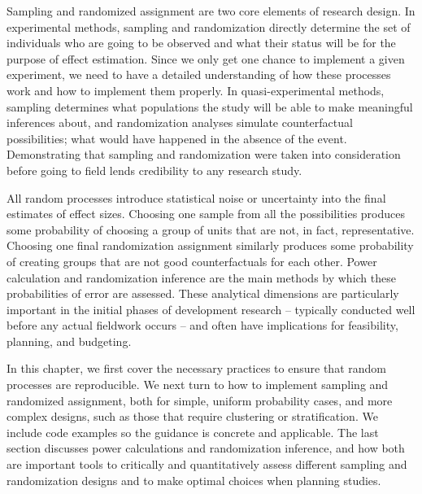 
\begin{fullwidth}
Sampling and randomized assignment are two core elements of research design.
In experimental methods, sampling and randomization directly determine
the set of individuals who are going to be observed
and what their status will be for the purpose of effect estimation.
Since we only get one chance to implement a given experiment,
we need to have a detailed understanding of how these processes work
and how to implement them properly.
In quasi-experimental methods, sampling determines what populations the study
will be able to make meaningful inferences about,
and randomization analyses simulate counterfactual possibilities;
what would have happened in the absence of the event.
Demonstrating that sampling and randomization were taken into consideration
before going to field lends credibility to any research study.

All random processes introduce statistical noise
or uncertainty into the final estimates of effect sizes.
Choosing one sample from all the possibilities produces some probability of
choosing a group of units that are not, in fact, representative.
Choosing one final randomization assignment similarly produces some probability of
creating groups that are not good counterfactuals for each other.
Power calculation and randomization inference
are the main methods by which these probabilities of error are assessed.
These analytical dimensions are particularly important in the initial phases of development research --
typically conducted well before any actual fieldwork occurs --
and often have implications for feasibility, planning, and budgeting.

In this chapter, we first cover the necessary practices to ensure that random processes are reproducible.
We next turn to how to implement sampling and randomized assignment,
both for simple, uniform probability cases, and more complex designs,
such as those that require clustering or stratification.
We include code examples so the guidance is concrete and applicable.
The last section discusses power calculations and randomization inference,
and how both are important tools to critically and quantitatively assess different
sampling and randomization designs and to make optimal choices when planning studies.


\end{fullwidth}

